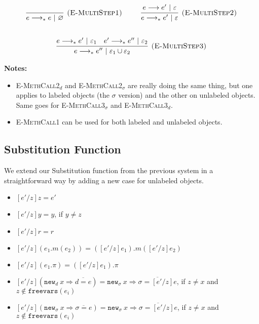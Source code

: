 \documentclass{llncs}
\newcommand{\keywadj}[1]{\mathtt{#1}}
\newcommand{\newd}[0]{
	\keywadj{new}_d~x \Rightarrow \overline{d = e}
}
\newcommand{\newsig}[0]{
	\keywadj{new}_\sigma~x \Rightarrow \overline{\sigma = e}
}
\begin{document}
\[
\begin{array}{c}

	\infer[\textsc{(E-MultiStep1)}]
	{e \longrightarrow_* e~|~\varnothing}
	{} ~~~~~~~~
	
	\infer[\textsc{(E-MultiStep2)}]
	{e \longrightarrow_* e'~|~\varepsilon}
	{e \longrightarrow e'~|~\varepsilon} \\[5ex]

	\infer[\textsc{(E-MultiStep3)}]
	{e \longrightarrow_* e''~|~\varepsilon_1 \cup \varepsilon_2}
	{e \longrightarrow_* e'~|~\varepsilon_1 & e' \longrightarrow_* e''~|~\varepsilon_2}

\end{array}
\]

\noindent \textbf{Notes:}
\begin{itemize}
	\item \textsc{E-MethCall2$_d$} and \textsc{E-MethCall2$_\sigma$} are really doing the same thing, but one applies to labeled objects (the $\sigma$ version) and the other on unlabeled objects. Same goes for \textsc{E-MethCall3$_\sigma$} and \textsc{E-MethCall3$_d$}.
	\item \textsc{E-MethCall1} can be used for both labeled and unlabeled objects.
\end{itemize}


\subsection{Substitution Function}


\noindent
We extend our Substitution function from the previous system in a straightforward way by adding a new case for unlabeled objects.

\begin{itemize}
	\item $[e'/z]z = e'$
	\item $[e'/z]y = y$, if $y \neq z$
	\item $[e'/z]r = r$
	\item $[e'/z](e_1.m(e_2)) = ([e'/z]e_1).m([e'/z]e_2)$
	\item $[e'/z](e_1.\pi) = ([e'/z]e_1).\pi$
	\item $[e'/z](\newd) = \keywadj{new}_\sigma~x \Rightarrow \overline{ \sigma = [e'/z]e }$, if $z \neq x$ and $z \notin \keywadj{freevars}(e_i)$
	\item $[e'/z](\newsig) = \keywadj{new}_\sigma~x \Rightarrow \overline{ \sigma = [e'/z]e }$, if $z \neq x$ and $z \notin \keywadj{freevars}(e_i)$
\end{itemize}
\end{document}
